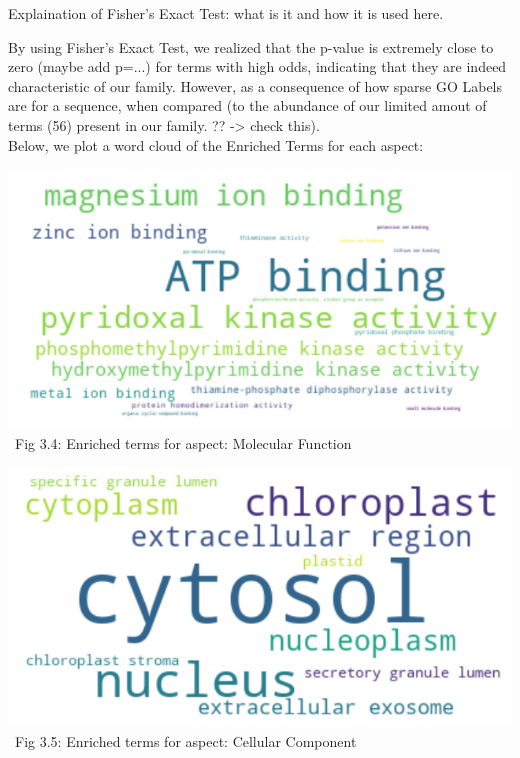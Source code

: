 \documentclass[10pt,twocolumn,letterpaper]{article}
\begin{document}
Explaination of Fisher's Exact Test: what is it and how it is used here.

By using Fisher's Exact Test, we realized that the p-value is extremely close to zero (maybe add p=...) for terms with high odds, indicating that they are indeed characteristic of our family. However, as a consequence of how sparse GO Labels are for a sequence, when compared (to the abundance of our limited amout of terms (56) present in our family. ?? -> check this). \\



Below, we plot a word cloud of the Enriched Terms for each aspect:

\begin{center}
    \includegraphics[scale=0.30]{report/img/word_cloud_mf.png} \\
    \
    \small{Fig 3.4: Enriched terms for aspect: Molecular Function}
\end{center}

\begin{center}
    \includegraphics[scale=0.30]{report/img/word_cloud_cc.png} \\
    \
    \small{Fig 3.5: Enriched terms for aspect: Cellular Component}
\end{center}
\end{document}
